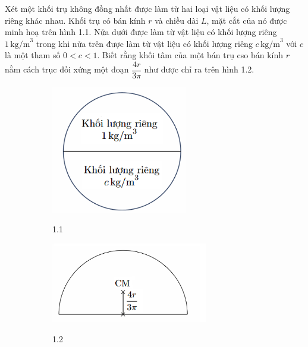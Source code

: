 \noindent Xét một khối trụ không đồng nhất được làm từ hai loại vật liệu có khối lượng riêng khác nhau. Khối trụ có bán kính $r$ và chiều dài $L$, mặt cắt của nó được minh hoạ trên hình 1.1. Nửa dưới được làm từ vật liệu có khối lượng riêng $1\,\text{kg/m}^3$ trong khi nửa trên được làm từ vật liệu có khối lượng riêng $c\,\text{kg/m}^3$ với $c$ là một tham số $0<c<1$. Biết rằng khối tâm của một bán trụ cso bán kính $r$ nằm cách trục đối xứng một đoạn $\dfrac{4r}{3\pi}$ như được chỉ ra trên hình 1.2.
\begin{figure}[h]
  \centering
  \begin{subfigure}[b]{0.49\textwidth}
    \centering
    \includegraphics[width=0.65\textwidth]{Figures/Problems/Fig 1.1.png}
    \begin{center}
      \figurename{ 1.1}
    \end{center}
  \end{subfigure}
  \hfill
  \begin{subfigure}[b]{0.49\textwidth}
    \centering
    \includegraphics[width=0.75\textwidth]{Figures/Problems/Fig 1.2.png}
    \begin{center}
      \figurename{ 1.2}
    \end{center}
  \end{subfigure}
\end{figure}

